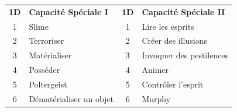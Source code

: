 \begin{frame}[b]
{\begin{center}
\begin{tabular}{clcl}
\textbf{1D} & \textbf{Capacité Spéciale I} & \textbf{1D} & \textbf{Capacité Spéciale II} \\
1 & Slime & 1 & Lire les esprits \\
2 & Terroriser & 2 & Créer des illusions \\
3 & Matérialiser & 3 & Invoquer des pestilences \\
4 & Posséder & 4 & Animer \\
5 & Poltergeist & 5 & Contrôler l'esprit \\
6 & Dématérialiser un objet & 6 & Murphy \\
\end{tabular}
\end{center}





}{

}

\end{frame}
